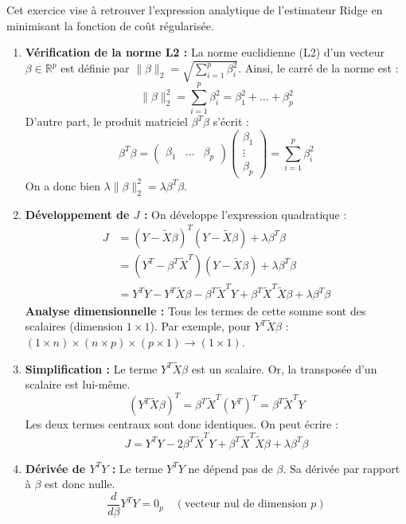 \documentclass[solutions]{../exercices}
\begin{document}
\begin{solution}
	Cet exercice vise à retrouver l'expression analytique de l'estimateur Ridge en minimisant la fonction de coût régularisée.

	\begin{enumerate}
		\item \textbf{Vérification de la norme L2 :}
		La norme euclidienne (L2) d'un vecteur $\beta \in \mathbb{R}^p$ est définie par $\|\beta\|_2 = \sqrt{\sum_{i=1}^p \beta_i^2}$.
		Ainsi, le carré de la norme est :
		\[ \|\beta\|_2^2 = \sum_{i=1}^p \beta_i^2 = \beta_1^2 + \dots + \beta_p^2 \]
		D'autre part, le produit matriciel $\beta^T \beta$ s'écrit :
		\[ \beta^T \beta = \begin{pmatrix} \beta_1 & \dots & \beta_p \end{pmatrix} \begin{pmatrix} \beta_1 \\ \vdots \\ \beta_p \end{pmatrix} = \sum_{i=1}^p \beta_i^2 \]
		On a donc bien $\lambda \|\beta\|_2^2 = \lambda \beta^T \beta$.

		\item \textbf{Développement de $J$ :}
		On développe l'expression quadratique :
		\[
		\begin{aligned}
			J &= (Y - \tilde{X}\beta)^T (Y - \tilde{X}\beta) + \lambda \beta^T \beta \\
			  &= (Y^T - \beta^T \tilde{X}^T) (Y - \tilde{X}\beta) + \lambda \beta^T \beta \\
			  &= Y^T Y - Y^T \tilde{X} \beta - \beta^T \tilde{X}^T Y + \beta^T \tilde{X}^T \tilde{X} \beta + \lambda \beta^T \beta
		\end{aligned}
		\]
		\textbf{Analyse dimensionnelle :} Tous les termes de cette somme sont des scalaires (dimension $1 \times 1$). Par exemple, pour $Y^T \tilde{X} \beta$ : $(1 \times n) \times (n \times p) \times (p \times 1) \rightarrow (1 \times 1)$.

		\item \textbf{Simplification :}
		Le terme $Y^T \tilde{X} \beta$ est un scalaire. Or, la transposée d'un scalaire est lui-même.
		\[ (Y^T \tilde{X} \beta)^T = \beta^T \tilde{X}^T (Y^T)^T = \beta^T \tilde{X}^T Y \]
		Les deux termes centraux sont donc identiques. On peut écrire :
		\[ J = Y^T Y - 2 \beta^T \tilde{X}^T Y + \beta^T \tilde{X}^T \tilde{X} \beta + \lambda \beta^T \beta \]

		\item \textbf{Dérivée de $Y^T Y$ :}
		Le terme $Y^T Y$ ne dépend pas de $\beta$. Sa dérivée par rapport à $\beta$ est donc nulle.
		\[ \frac{d}{d\beta} Y^T Y = 0_p \quad (\text{vecteur nul de dimension } p) \]


\end{enumerate}
\end{solution}
\end{document}
